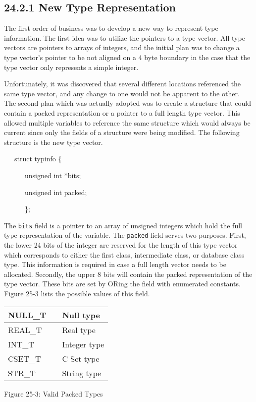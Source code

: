 \subsection[24.2.1 New Type Representation]{24.2.1 New Type Representation}

The first order of business was to develop a new way to represent type
information. The first idea was to utilize the pointers to a type
vector. All type vectors are pointers to arrays of integers, and the
initial plan was to change a type vector's pointer to be not aligned
on a 4 byte boundary in the case that the type vector only represents
a simple integer.

Unfortunately, it was discovered that several different locations
referenced the same type vector, and any change to one would not be
apparent to the other. The second plan which was actually adopted was
to create a structure that could contain a packed representation or a
pointer to a full length type vector. This allowed multiple variables
to reference the same structure which would always be current since
only the fields of a structure were being modified.  The following
structure is the new type vector.

{\ttfamily\mdseries
\ \ \ struct typinfo \{}

{\ttfamily\mdseries
\ \ \ \ \ \ unsigned int *bits;}

{\ttfamily\mdseries
\ \ \ \ \ \ unsigned int packed;}

{\ttfamily\mdseries
\ \ \ \ \ \ \};}


The \texttt{bits} field is a pointer to an array of unsigned integers
which hold the full type representation of the variable. The
\texttt{packed} field serves two purposes. First, the lower 24 bits of
the integer are reserved for the length of this type vector which
corresponds to either the first class, intermediate class, or database
class type. This information is required in case a full length vector
needs to be allocated. Secondly, the upper 8 bits will contain the
packed representation of the type vector. These bits are set by ORing
the field with enumerated constants. Figure 25-3 lists the possible
values of this field.

\begin{center}
\tabletail{}
\tablelasttail{}
\begin{supertabular}{|m{0.6629598in}|m{0.42545983in}|m{0.8122598in}|}
\hline
 NULL\_T &
 &
 Null type\\\hline
 REAL\_T &
 &
 Real type\\\hline
 INT\_T &
 &
 Integer type\\\hline
 CSET\_T &
 &
 C Set type\\\hline
 STR\_T &
 &
 String type\\\hline
\end{supertabular}
\end{center}
{\centering{}
Figure 25-3: Valid Packed Types
\par}

